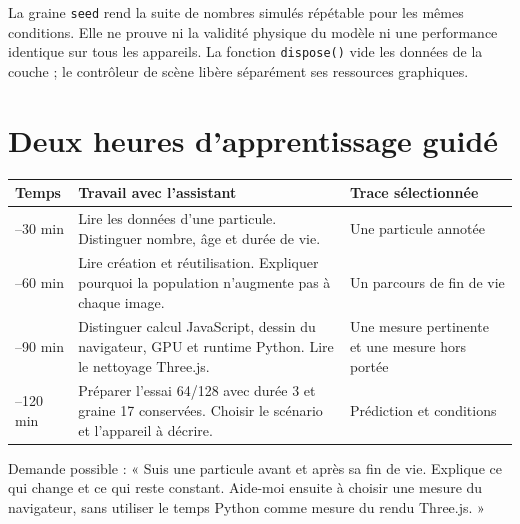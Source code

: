 \documentclass[
  canadien,
  11pt,
  a4paper,
]{report}
\newcounter{none} %
\begin{document}
La graine \texttt{seed} rend la suite de nombres simulés répétable pour
les mêmes conditions. Elle ne prouve ni la validité physique du modèle
ni une performance identique sur tous les appareils. La fonction
\texttt{dispose()} vide les données de la couche ; le contrôleur de
scène libère séparément ses ressources graphiques.

\section{Deux heures d'apprentissage
guidé}\label{deux-heures-dapprentissage-guiduxe9-5}

{\def\LTcaptype{none} %
\begin{longtable}[]{@{}
  >{\raggedright\arraybackslash}p{}
  >{\raggedright\arraybackslash}p{}
  >{\raggedright\arraybackslash}p{}@{}}
\toprule\noalign{}
\begin{minipage}[b]{\linewidth}\raggedright
Temps
\end{minipage} & \begin{minipage}[b]{\linewidth}\raggedright
Travail avec l'assistant
\end{minipage} & \begin{minipage}[b]{\linewidth}\raggedright
Trace sélectionnée
\end{minipage} \\
\midrule\noalign{}
\endhead
\bottomrule\noalign{}
\endlastfoot
0--30 min & Lire les données d'une particule. Distinguer nombre, âge et
durée de vie. & Une particule annotée \\
30--60 min & Lire création et réutilisation. Expliquer pourquoi la
population n'augmente pas à chaque image. & Un parcours de fin de vie \\
60--90 min & Distinguer calcul JavaScript, dessin du navigateur, GPU et
runtime Python. Lire le nettoyage Three.js. & Une mesure pertinente et
une mesure hors portée \\
90--120 min & Préparer l'essai 64/128 avec durée 3 et graine 17
conservées. Choisir le scénario et l'appareil à décrire. & Prédiction et
conditions \\
\end{longtable}
}

Demande possible : « Suis une particule avant et après sa fin de vie.
Explique ce qui change et ce qui reste constant. Aide-moi ensuite à
choisir une mesure du navigateur, sans utiliser le temps Python comme
mesure du rendu Three.js. »
\end{document}

